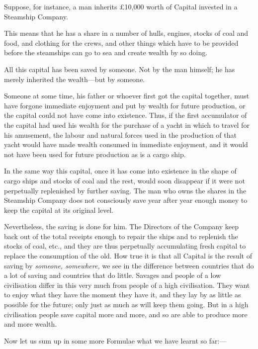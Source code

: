 \documentclass{book}
\begin{document}
Suppose, for instance, a man inherits £10,000 worth of Capital invested in a Steamship Company.

This means that he has a share in a number of hulls, engines, stocks of coal and food, and clothing for the crews, and other things which have to be provided before the steamships can go to sea and create wealth by so doing.

All this capital has been saved by someone. Not by the man himself; he has merely inherited the wealth—but by someone.

Someone at some time, his father or whoever first got the capital together, must have forgone immediate enjoyment and put by wealth for future production, or the capital could not have come into existence. Thus, if the first accumulator of the capital had used his wealth for the purchase of a yacht in which to travel for his amusement, the labour and natural forces used in the production of that yacht would have made wealth consumed in immediate enjoyment, and it would not have been used for future production as is a cargo ship.

In the same way this capital, once it has come into existence in the shape of cargo ships and stocks of coal and the rest, would soon disappear if it were not perpetually replenished by further saving. The man who owns the shares in the Steamship Company does not consciously save year after year enough money to keep the capital at its original level.

Nevertheless, the saving is done for him. The Directors of the Company keep back out of the total receipts enough to repair the ships and to replenish the stocks of coal, etc., and they are thus perpetually accumulating fresh capital to replace the consumption of the old. How true it is that all Capital is the result of saving by \emph{someone, somewhere,} we see in the difference between countries that do a lot of saving and countries that do little. Savages and people of a low civilisation differ in this very much from people of a high civilisation. They want to enjoy what they have the moment they have it, and they lay by as little as possible for the future; only just as much as will keep them going. But in a high civilisation people save capital more and more, and so are able to produce more and more wealth.

Now let us sum up in some more Formulae what we have learnt so far:—
\end{document}
